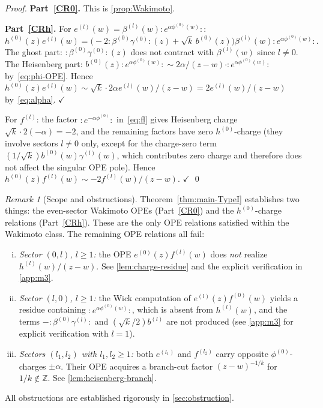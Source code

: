 \documentclass[12pt]{article}
\theoremstyle{plain}
\theoremstyle{definition}
\theoremstyle{remark}
\newtheorem{remark}[theorem]{Remark}
\newcommand{\Z}{\mathbb{Z}}
\newcommand{\bl}[1]{\beta^{(#1)}}
\newcommand{\gl}[1]{\gamma^{(#1)}}
\newcommand{\el}[1]{e^{(#1)}}
\newcommand{\hl}[1]{h^{(#1)}}
\newcommand{\fl}[1]{f^{(#1)}}
\newcommand{\OPE}{\sim}
\newcommand{\no}[1]{:\!#1\!:}
\begin{document}
\begin{proof}
  \textbf{Part~\ref{CR0}.} This is \cref{prop:Wakimoto}.

  \medskip\noindent
  \textbf{Part~\ref{CRh}.}
  For $\el{l}(w)=\bl{l}(w)\no{e^{\alpha\phi^{(0)}(w)}}$:
  \[
    \hl{0}(z)\el{l}(w)
    =\bigl(-2\no{\bl{0}\gl{0}}(z)+\sqrt{k}\,b^{(0)}(z)\bigr)
     \bl{l}(w)\no{e^{\alpha\phi^{(0)}(w)}}.
  \]
  The ghost part: $\no{\bl{0}\gl{0}}(z)$ does not contract with $\bl{l}(w)$ since
  $l\neq 0$.
  The Heisenberg part: $b^{(0)}(z)\no{e^{\alpha\phi^{(0)}(w)}}
  \OPE 2\alpha/(z-w)\cdot\no{e^{\alpha\phi^{(0)}(w)}}$ by~\eqref{eq:phi-OPE}.
  Hence $\hl{0}(z)\el{l}(w)\OPE \sqrt{k}\cdot 2\alpha\el{l}(w)/(z-w)=2\el{l}(w)/(z-w)$
  by~\eqref{eq:alpha}. $\checkmark$

  For $\fl{l}$: the factor $\no{e^{-\alpha\phi^{(0)}}}$ in~\eqref{eq:fl} gives
  Heisenberg charge $\sqrt{k}\cdot 2(-\alpha)=-2$, and the remaining factors
  have zero $h^{(0)}$-charge (they involve sectors $l\neq 0$ only, except for
  the charge-zero term $(1/\sqrt{k})b^{(0)}(w)\gl{l}(w)$, which contributes
  zero charge and therefore does not affect the singular OPE pole).
  Hence $\hl{0}(z)\fl{l}(w)\OPE -2\fl{l}(w)/(z-w)$. $\checkmark$
  \qed
\end{proof}

\begin{remark}[Scope and obstructions]
\label{rem:scope-TypeI}
  Theorem~\ref{thm:main-TypeI} establishes two things: the even-sector Wakimoto
  OPEs (Part~\ref{CR0}) and the $h^{(0)}$-charge relations (Part~\ref{CRh}).
  These are the only OPE relations satisfied within the Wakimoto class.
  The remaining OPE relations all fail:
  \begin{enumerate}[(i)]
    \item \emph{Sector $(0,l)$, $l\geq 1$:} the OPE $\el{0}(z)\fl{l}(w)$ does
      \emph{not} realize $\hl{l}(w)/(z-w)$.
      See \cref{lem:charge-residue} and the explicit verification in \cref{app:m3}.
    \item \emph{Sector $(l,0)$, $l\geq 1$:} the Wick computation of $\el{l}(z)\fl{0}(w)$
      yields a residue containing $\no{e^{\alpha\phi^{(0)}(w)}}$, which is absent
      from $\hl{l}(w)$, and the terms $-\no{\bl{0}\gl{l}}$ and $(\sqrt{k}/2)b^{(l)}$
      are not produced (see \cref{app:m3} for explicit verification with $l=1$).
    \item \emph{Sectors $(l_1,l_2)$ with $l_1,l_2\geq 1$:} both $\el{l_1}$ and
      $\fl{l_2}$ carry opposite $\phi^{(0)}$-charges $\pm\alpha$.  Their OPE
      acquires a branch-cut factor $(z-w)^{-1/k}$ for $1/k\notin\Z$.
      See \cref{lem:heisenberg-branch}.
  \end{enumerate}
  All obstructions are established rigorously in \cref{sec:obstruction}.
\end{remark}
\end{document}
